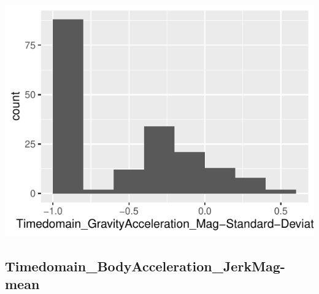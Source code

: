 \documentclass[
]{article}
\begin{document}
\begin{minipage}{0.25 \textwidth}

\includegraphics{codebook_tidydatasub_files/figure-latex/Var-36-Timedomain-GravityAcceleration-Mag-Standard-Deviation--1.pdf}

\end{minipage}

\noindent\makebox[\linewidth]{\rule{\textwidth}{0.4pt}}

\hypertarget{timedomain_bodyacceleration_jerkmag-mean}{%
\subsection{Timedomain\_BodyAcceleration\_JerkMag-mean}\label{timedomain_bodyacceleration_jerkmag-mean}}
\end{document}
